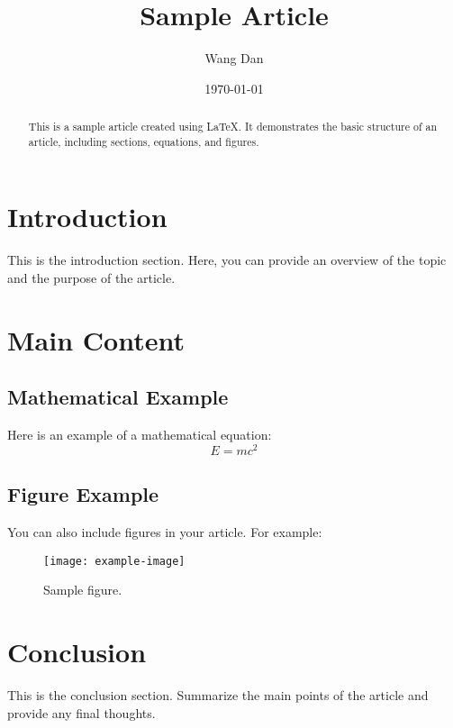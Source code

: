 \documentclass[12pt]{article}
\title{Sample Article}
\author{Wang Dan}
\date{\today}
\begin{document}
\maketitle

\begin{abstract}
This is a sample article created using \LaTeX. It demonstrates the basic structure of an article, including sections, equations, and figures.
\end{abstract}

\section{Introduction}
This is the introduction section. Here, you can provide an overview of the topic and the purpose of the article.

\section{Main Content}
\subsection{Mathematical Example}
Here is an example of a mathematical equation:
\begin{equation}
E = mc^2
\end{equation}

\subsection{Figure Example}
You can also include figures in your article. For example:
\begin{figure}[h!]
    \centering
    \texttt{[image: example-image]}
    \caption{Sample figure.}
    \label{fig:sample}
\end{figure}

\section{Conclusion}
This is the conclusion section. Summarize the main points of the article and provide any final thoughts.
\end{document}
